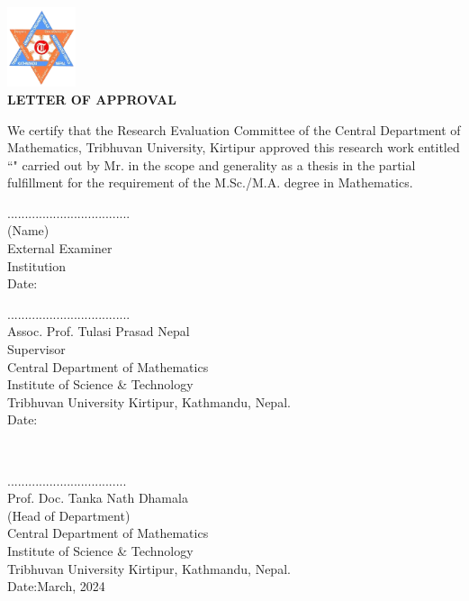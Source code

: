 
 \begin{center}
 	\includegraphics[width=0.15\textwidth]{pictures/tulogo.png}\\[1.5cm]
 {\Large{\bfseries{LETTER OF APPROVAL}}}\\[.5cm]
\end{center}

\noindent
We certify that the Research Evaluation Committee of the Central Department of Mathematics, Tribhuvan University, Kirtipur approved this research work entitled ``\textbf{\thetitle}" carried out by Mr. \textbf{\theauthor} in the scope and generality as a thesis in the partial fulfillment for the requirement of the M.Sc./M.A. degree in Mathematics.
\\[3.5cm]
\begin{minipage}{0.45\textwidth}
		...................................\\
		(Name) \\
		External Examiner\\
		Institution \\[0.1cm]
		Date:
\end{minipage}
%
\begin{minipage}{0.6\textwidth}
	...................................\\
		Assoc. Prof. Tulasi Prasad Nepal \\
		Supervisor \\
		Central Department of Mathematics\\
                Institute of Science \& Technology\\
                Tribhuvan University
                Kirtipur, Kathmandu, Nepal.\\[0.1cm]
		Date:

\end{minipage}\\[3cm]

\begin{center}
..................................\\
Prof. Doc. Tanka Nath Dhamala\\
	(Head of Department)\\
 Central Department of Mathematics\\
	 Institute of Science \& Technology\\
	 Tribhuvan University
	  Kirtipur, Kathmandu, Nepal.\\
	  \newline
	Date:March, 2024
\end{center}

